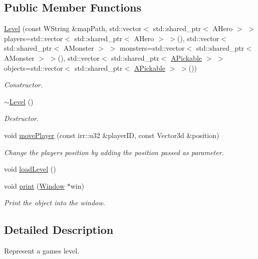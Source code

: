 \subsection*{Public Member Functions}
\begin{DoxyCompactItemize}
\item 
\hyperlink{classLevel_a1cddef79da66a80002686199a847543f}{Level} (const W\+String \&map\+Path, std\+::vector$<$ std\+::shared\+\_\+ptr$<$ A\+Hero $>$ $>$ players=std\+::vector$<$ std\+::shared\+\_\+ptr$<$ A\+Hero $>$ $>$(), std\+::vector$<$ std\+::shared\+\_\+ptr$<$ A\+Monster $>$ $>$ monsters=std\+::vector$<$ std\+::shared\+\_\+ptr$<$ A\+Monster $>$ $>$(), std\+::vector$<$ std\+::shared\+\_\+ptr$<$ \hyperlink{classAPickable}{A\+Pickable} $>$ $>$ objects=std\+::vector$<$ std\+::shared\+\_\+ptr$<$ \hyperlink{classAPickable}{A\+Pickable} $>$ $>$())
\begin{DoxyCompactList}\small\item\em Constructor. \end{DoxyCompactList}\item 
\hyperlink{classLevel_a249eac1e8f19ff44134efa5e986feaca}{$\sim$\+Level} ()
\begin{DoxyCompactList}\small\item\em Destructor. \end{DoxyCompactList}\item 
void \hyperlink{classLevel_ac679a141274c19107c288fe40b967e95}{move\+Player} (const irr\+::u32 \&player\+ID, const Vector3d \&position)
\begin{DoxyCompactList}\small\item\em Change the player\textquotesingle{}s position by adding the position passed as parameter. \end{DoxyCompactList}\item 
void \hyperlink{classLevel_aa88db36cd824320cb599d913603dc2a3}{load\+Level} ()
\item 
void \hyperlink{classLevel_ab8311fe64b7957d627053359331b0b6b}{print} (\hyperlink{classWindow}{Window} $\ast$win)
\begin{DoxyCompactList}\small\item\em Print the object into the window. \end{DoxyCompactList}\end{DoxyCompactItemize}


\subsection{Detailed Description}
Represent a game\textquotesingle{}s level. 


